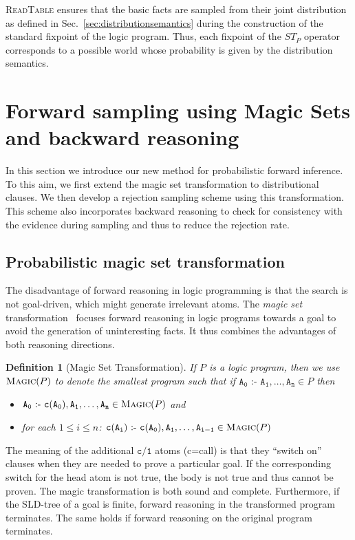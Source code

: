 \documentclass{tlp}
\newtheorem{definition}{Definition}
\newcommand{\coloneq}{\mbox{ :- }}
\begin{document}
\textsc{ReadTable} ensures that the basic facts are sampled from their
joint distribution as defined in Sec.~\ref{sec:distributionsemantics} during the
construction of the standard fixpoint of the logic program. Thus, each
fixpoint of the $ST_P$ operator corresponds to a possible
world whose probability is given by the distribution semantics.
 

\section{Forward sampling using Magic Sets and backward reasoning}
\label{sec:algorithms} 

In this section we introduce our new method for probabilistic forward
inference.  To this aim, we first extend the magic set transformation
to distributional clauses. We then develop a rejection sampling scheme
using this transformation. This scheme also incorporates backward
reasoning to check for consistency with the evidence during sampling
and thus to reduce the rejection rate.

\subsection{Probabilistic magic set transformation}
\label{sec:magic}

The disadvantage of forward reasoning in logic programming is that the
search is not goal-driven, which might generate irrelevant atoms.  The
\emph{magic set} transformation~\cite{bancilhon,nilsson:book} focuses
forward reasoning in logic programs towards a goal to avoid the
generation of uninteresting facts. It thus combines the advantages of
both reasoning directions.

\begin{definition}[Magic Set Transformation]
  \label{def:magicsets}
  If $P$ is a logic program, then we use $\textsc{Magic}(P)$ to denote the
  smallest program such that if $\mathtt{A_0 \coloneq A_1,\ldots, A_n}
  \in P$ then
  \begin{itemize}
  \item $\mathtt{A_0 \coloneq c(A_0), A_1, \ldots, A_n }\in \textsc{Magic}(P)$ and
  \item for each $1\le i \le n$: $\mathtt{c(A_i) \coloneq c(A_0),  A_1,\ldots, A_{i-1} }\in \textsc{Magic}(P)$
  \end{itemize}
\end{definition}

The meaning of the additional $\mathtt{c/1}$ atoms (c=call) is that
they ``switch on'' clauses when they are needed to prove a particular
goal. If the corresponding switch for the head atom is not true, the
body is not true and thus cannot be proven.  The magic transformation
is both sound and complete. Furthermore, if the SLD-tree of a goal is
finite, forward reasoning in the transformed program terminates. The
same holds if forward reasoning on the original program terminates.
\end{document}
